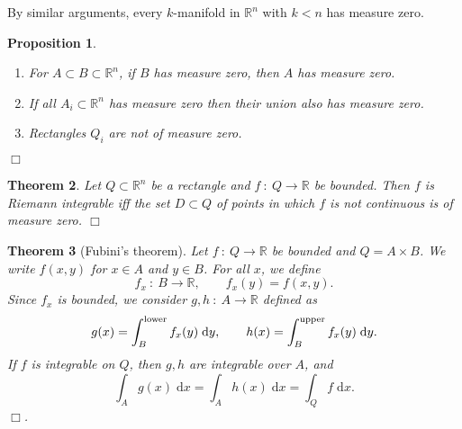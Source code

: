 \documentclass[letter-paper]{tufte-book}
\newtheorem{theorem}{\color{pastel-blue}Theorem}[section]
\newtheorem{proposition}[theorem]{\color{pastel-blue}Proposition}
\newcommand{\qedwhite}{\hfill \ensuremath{\Box}}
\begin{document}
By similar arguments, every $k$-manifold in $\mathbb{R}^n$ with $k<n$ has measure zero.

\begin{proposition}
  \begin{enumerate}
    \item For $A \subset B \subset \mathbb{R}^n$, if $B$ has measure zero, then $A$ has measure zero.
    \item If all $A_i \subset \mathbb{R}^n$ has measure zero then their union also has measure zero.
    \item Rectangles $Q_i$ are not of measure zero.
  \end{enumerate}
  \qedwhite
\end{proposition}

\begin{theorem}
  Let $Q\subset \mathbb{R}^n$ be a rectangle and $f\ :\ Q \to \mathbb{R}$ be bounded. Then $f$ is Riemann integrable iff the set $D \subset Q$ of points in which $f$ is not continuous is of measure zero. \qedwhite
\end{theorem}

\begin{theorem}[Fubini's theorem]\label{thm:fubini}
  Let $f\ :\ Q \to \mathbb{R}$ be bounded and $Q = A \times B$. We write $f(x,y)$ for $x\in A$ and $y\in B$. For all $x$, we define
  \begin{equation*}
    f_x\ :\ B \to \mathbb{R}, \qquad f_x(y) = f(x,y).
  \end{equation*}
  Since $f_x$ is bounded, we consider $g, h\ :\ A\to\mathbb{R}$ defined as
  \begin{equation*}
    g(x) = \int_B^{\textnormal{lower}} f_x(y)\; \mathrm{d}y, \qquad h(x) = \int_B^{\textnormal{upper}} f_x(y)\; \mathrm{d}y.
  \end{equation*}
  If $f$ is integrable on $Q$, then $g, h$ are integrable over $A$, and
  \begin{equation}
    \int_A g(x)\; \mathrm{d}x = \int_A h(x)\; \mathrm{d}x = \int_Q f\; \mathrm{d}x.
  \end{equation}
  \qedwhite.
\end{theorem}
\end{document}
